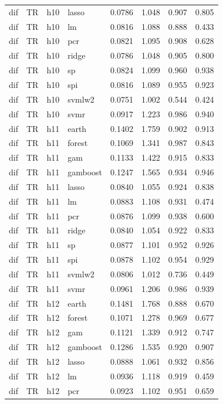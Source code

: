 \begin{ThreePartTable}
\begin{longtable}[t]{llclcccc}
dif & TR & h10 & lasso & 0.0786 & 1.048 & 0.907 & 0.805\\
dif & TR & h10 & lm & 0.0816 & 1.088 & 0.888 & 0.433\\
dif & TR & h10 & pcr & 0.0821 & 1.095 & 0.908 & 0.628\\
dif & TR & h10 & ridge & 0.0786 & 1.048 & 0.905 & 0.800\\
dif & TR & h10 & sp & 0.0824 & 1.099 & 0.960 & 0.938\\
dif & TR & h10 & spi & 0.0816 & 1.089 & 0.955 & 0.923\\
dif & TR & h10 & svmlw2 & 0.0751 & 1.002 & 0.544 & 0.424\\
dif & TR & h10 & svmr & 0.0917 & 1.223 & 0.986 & 0.940\\
\addlinespace
dif & TR & h11 & earth & 0.1402 & 1.759 & 0.902 & 0.913\\
dif & TR & h11 & forest & 0.1069 & 1.341 & 0.987 & 0.843\\
dif & TR & h11 & gam & 0.1133 & 1.422 & 0.915 & 0.833\\
dif & TR & h11 & gamboost & 0.1247 & 1.565 & 0.934 & 0.946\\
dif & TR & h11 & lasso & 0.0840 & 1.055 & 0.924 & 0.838\\
dif & TR & h11 & lm & 0.0883 & 1.108 & 0.931 & 0.474\\
dif & TR & h11 & pcr & 0.0876 & 1.099 & 0.938 & 0.600\\
dif & TR & h11 & ridge & 0.0840 & 1.054 & 0.922 & 0.833\\
dif & TR & h11 & sp & 0.0877 & 1.101 & 0.952 & 0.926\\
dif & TR & h11 & spi & 0.0878 & 1.102 & 0.954 & 0.929\\
dif & TR & h11 & svmlw2 & 0.0806 & 1.012 & 0.736 & 0.449\\
dif & TR & h11 & svmr & 0.0961 & 1.206 & 0.986 & 0.939\\
\addlinespace
dif & TR & h12 & earth & 0.1481 & 1.768 & 0.888 & 0.670\\
dif & TR & h12 & forest & 0.1071 & 1.278 & 0.969 & 0.677\\
dif & TR & h12 & gam & 0.1121 & 1.339 & 0.912 & 0.747\\
dif & TR & h12 & gamboost & 0.1286 & 1.535 & 0.920 & 0.907\\
dif & TR & h12 & lasso & 0.0888 & 1.061 & 0.932 & 0.856\\
dif & TR & h12 & lm & 0.0936 & 1.118 & 0.919 & 0.459\\
dif & TR & h12 & pcr & 0.0923 & 1.102 & 0.951 & 0.659\\

\end{longtable}
\end{ThreePartTable}
